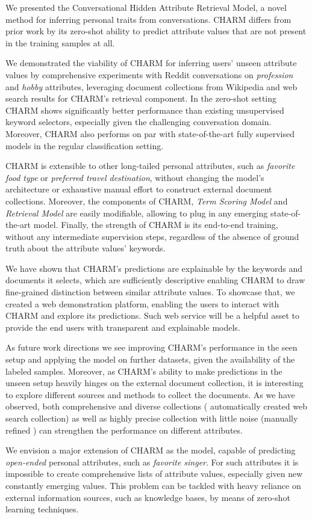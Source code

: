 \balance

We presented the 
Conversational 
Hidden 
Attribute 
Retrieval 
Model, a novel method 
for inferring personal traits from conversations. CHARM differs from prior
work by its zero-shot ability to
predict attribute values 
that are not present in the training samples
at all.

We demonstrated 
the viability of CHARM
for inferring users' unseen attribute values
by comprehensive 
experiments with Reddit conversations on \textit{profession} and \textit{hobby} attributes,
leveraging document collections from Wikipedia and web search results
for CHARM's retrieval component.
In the zero-shot setting CHARM shows significantly better performance than existing unsupervised keyword selectors, especially given the challenging conversation domain. Moreover, CHARM also performs on par with state-of-the-art fully supervised models in the regular classification setting.

CHARM is extensible to other long-tailed personal attributes, such as \textit{favorite food type} or \textit{preferred travel destination}, without changing the model's architecture or exhaustive manual effort to construct external document collections. Moreover, the components of CHARM, \textit{Term Scoring Model} and \textit{Retrieval Model} are easily modifiable, allowing to plug in any emerging state-of-the-art model. Finally, the strength of CHARM is its end-to-end training, without any intermediate supervision steps, regardless of the absence of ground truth about the attribute values' keywords.

We have shown that CHARM's predictions are explainable by the keywords and documents it selects, which are sufficiently descriptive enabling CHARM to draw fine-grained distinction between similar attribute values. To showcase that, we created a web demonstration platform, enabling the users to interact with CHARM and explore its predictions. Such web service will be a helpful asset to provide the end users with transparent and explainable models. 

As future work directions we see improving CHARM's performance in the seen setup and applying the model on further datasets, given the availability of the labeled samples. Moreover, as CHARM's ability to make predictions in the unseen setup heavily hinges on the external document collection, it is interesting to explore different sources and methods to collect the documents. As we have observed, both comprehensive and diverse collections ( automatically created web search collection) as well as highly precise collection with little noise (manually refined ) can strengthen the performance on different attributes.

We envision a major extension of CHARM as the model, capable of predicting \textit{open-ended} personal attributes, such as \textit{favorite singer}. For such attributes it is impossible to create comprehensive lists of attribute values, especially given new constantly emerging values. This problem can be tackled with heavy reliance on external information sources, such as knowledge bases, by means of zero-shot learning techniques.